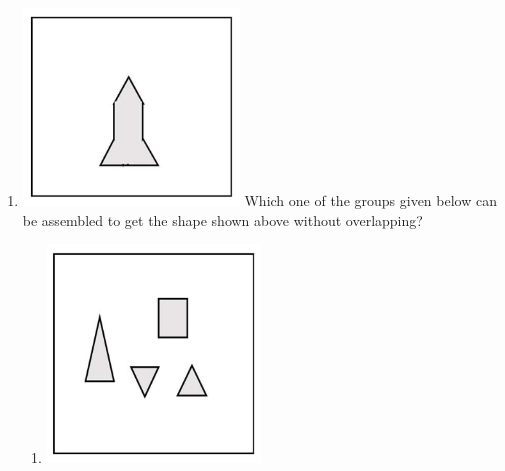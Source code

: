 \documentclass[journal,12pt,onecolumn]{IEEEtran}
\theoremstyle{remark}
\begin{document}
\begin{enumerate}
\item \centering \includegraphics[width=\columnwidth]{figs/fig_5.png} Which one of the groups given below can be assembled to get the shape shown above without overlapping?
\begin{enumerate}
    \item \includegraphics[width=\columnwidth]{figs/fig_5.1.png}

\end{enumerate}
\end{enumerate}
\end{document}
